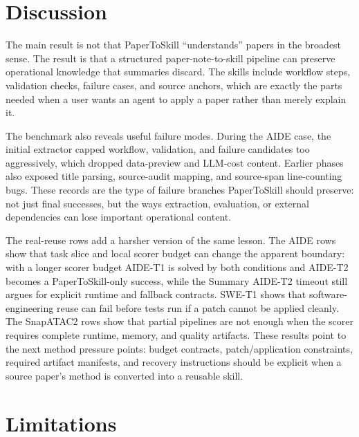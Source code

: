\documentclass[letterpaper]{article}
\begin{document}
\section{Discussion}

The main result is not that PaperToSkill ``understands'' papers in the broadest
sense. The result is that a structured paper-note-to-skill pipeline can preserve
operational knowledge that summaries discard. The skills include workflow
steps, validation checks, failure cases, and source anchors, which are exactly
the parts needed when a user wants an agent to apply a paper rather than merely
explain it.

The benchmark also reveals useful failure modes. During the AIDE case, the
initial extractor capped workflow, validation, and failure candidates too
aggressively, which dropped data-preview and LLM-cost content. Earlier phases
also exposed title parsing, source-audit mapping, and source-span line-counting
bugs. These records are the type of failure branches PaperToSkill should
preserve: not just final successes, but the ways extraction, evaluation, or
external dependencies can lose important operational content.

The real-reuse rows add a harsher version of the same lesson. The AIDE rows
show that task slice and local scorer budget can change the apparent boundary:
with a longer scorer budget AIDE-T1 is solved by both conditions and AIDE-T2
becomes a PaperToSkill-only success, while the Summary AIDE-T2 timeout still
argues for explicit runtime and fallback contracts. SWE-T1 shows that
software-engineering reuse can fail before tests run if a patch cannot be
applied cleanly. The SnapATAC2 rows show that partial pipelines are not enough
when the scorer requires complete runtime, memory, and quality artifacts. These
results point to the next method pressure points: budget contracts,
patch/application constraints, required artifact manifests, and recovery
instructions should be explicit when a source paper's method is converted into
a reusable skill.

\section{Limitations}
\end{document}
